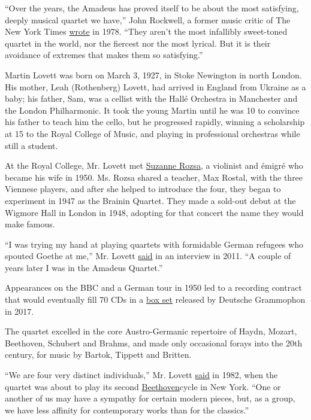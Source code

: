 ``Over the years, the Amadeus has proved itself to be about the most
satisfying, deeply musical quartet we have,'' John Rockwell, a former
music critic of The New York Times \href{https://nyti.ms/2Ww3P4I}{wrote}
in 1978. ``They aren't the most infallibly sweet-toned quartet in the
world, nor the fiercest nor the most lyrical. But it is their avoidance
of extremes that makes them so satisfying.''

Martin Lovett was born on March 3, 1927, in Stoke Newington in north
London. His mother, Leah (Rothenberg) Lovett, had arrived in England
from Ukraine as a baby; his father, Sam, was a cellist with the Hallé
Orchestra in Manchester and the London Philharmonic. It took the young
Martin until he was 10 to convince his father to teach him the cello,
but he progressed rapidly, winning a scholarship at 15 to the Royal
College of Music, and playing in professional orchestras while still a
student.

At the Royal College, Mr. Lovett met
\href{https://www.thetimes.co.uk/article/suzanne-rozsa-6nctx7ks0h3}{Suzanne
Rozsa}, a violinist and émigré who became his wife in 1950. Ms. Rozsa
shared a teacher, Max Rostal, with the three Viennese players, and after
she helped to introduce the four, they began to experiment in 1947 as
the Brainin Quartet. They made a sold-out debut at the Wigmore Hall in
London in 1948, adopting for that concert the name they would make
famous.

``I was trying my hand at playing quartets with formidable German
refugees who spouted Goethe at me,'' Mr. Lovett
\href{https://www.thejc.com/culture/music/interview-martin-lovett-1.23768}{said}
in an interview in 2011. ``A couple of years later I was in the Amadeus
Quartet.''

Appearances on the BBC and a German tour in 1950 led to a recording
contract that would eventually fill 70 CDs in a
\href{https://www.deutschegrammophon.com/en/catalogue/products/amadeus-quartet-complete-rec-7930}{box
set} released by Deutsche Grammophon in 2017.

The quartet excelled in the core Austro-Germanic repertoire of Haydn,
Mozart, Beethoven, Schubert and Brahms, and made only occasional forays
into the 20th century, for music by Bartok, Tippett and Britten.

``We are four very distinct individuals,'' Mr. Lovett
\href{https://www.nytimes.com/1982/03/05/arts/amadeus-quartet-at-35-plays-beethoven-cycle.html}{said}
in 1982, when the quartet was about to play its second
\href{https://www.youtube.com/watch?v=WKY43du5xSo\&feature=youtu.be}{Beethoven}cycle
in New York. ``One or another of us may have a sympathy for certain
modern pieces, but, as a group, we have less affinity for contemporary
works than for the classics.''

